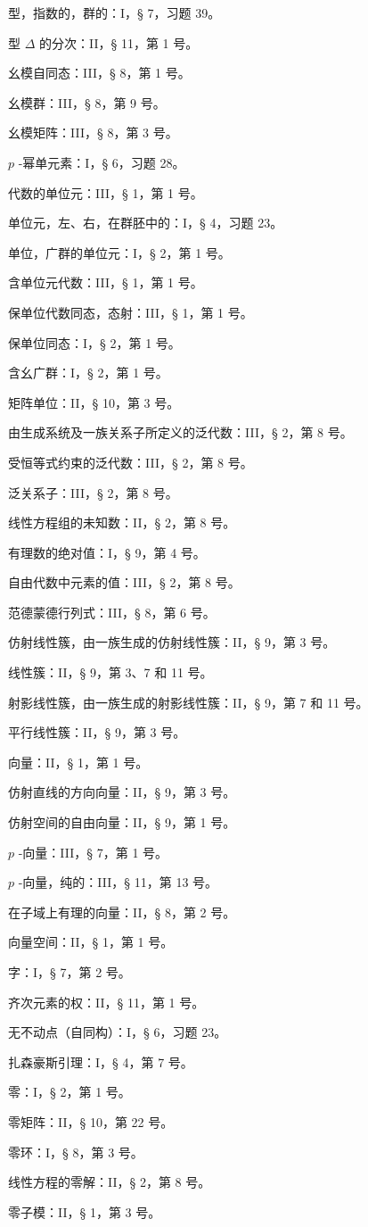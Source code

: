 型，指数的，群的：I，§ 7，习题 39。

型 \(\Delta\) 的分次：II，§ 11，第 1 号。

幺模自同态：III，§ 8，第 1 号。

幺模群：III，§ 8，第 9 号。

幺模矩阵：III，§ 8，第 3 号。

\(p\) -幂单元素：I，§ 6，习题 28。

代数的单位元：III，§ 1，第 1 号。

单位元，左、右，在群胚中的：I，§ 4，习题 23。

单位，广群的单位元：I，§ 2，第 1 号。

含单位元代数：III，§ 1，第 1 号。

保单位代数同态，态射：III，§ 1，第 1 号。

保单位同态：I，§ 2，第 1 号。

含幺广群：I，§ 2，第 1 号。

矩阵单位：II，§ 10，第 3 号。

由生成系统及一族关系子所定义的泛代数：III，§ 2，第 8 号。

受恒等式约束的泛代数：III，§ 2，第 8 号。

泛关系子：III，§ 2，第 8 号。

线性方程组的未知数：II，§ 2，第 8 号。

有理数的绝对值：I，§ 9，第 4 号。

自由代数中元素的值：III，§ 2，第 8 号。

范德蒙德行列式：III，§ 8，第 6 号。

仿射线性簇，由一族生成的仿射线性簇：II，§ 9，第 3 号。

线性簇：II，§ 9，第 3、7 和 11 号。

射影线性簇，由一族生成的射影线性簇：II，§ 9，第 7 和 11 号。

平行线性簇：II，§ 9，第 3 号。

向量：II，§ 1，第 1 号。

仿射直线的方向向量：II，§ 9，第 3 号。

仿射空间的自由向量：II，§ 9，第 1 号。

\(p\) -向量：III，§ 7，第 1 号。

\(p\) -向量，纯的：III，§ 11，第 13 号。

在子域上有理的向量：II，§ 8，第 2 号。

向量空间：II，§ 1，第 1 号。

字：I，§ 7，第 2 号。

齐次元素的权：II，§ 11，第 1 号。

无不动点（自同构）：I，§ 6，习题 23。

扎森豪斯引理：I，§ 4，第 7 号。

零：I，§ 2，第 1 号。

零矩阵：II，§ 10，第 22 号。

零环：I，§ 8，第 3 号。

线性方程的零解：II，§ 2，第 8 号。

零子模：II，§ 1，第 3 号。
